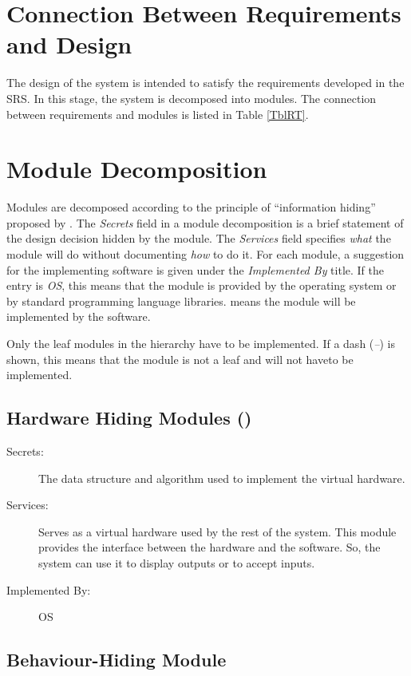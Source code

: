 \documentclass[12pt, titlepage]{article}
\begin{document}
\section{Connection Between Requirements and Design} \label{SecConnection}

The design of the system is intended to satisfy the requirements developed in
the SRS. In this stage, the system is decomposed into modules. The connection
between requirements and modules is listed in Table \ref{TblRT}.

\section{Module Decomposition} \label{SecMD}

Modules are decomposed according to the principle of ``information hiding''
proposed by \citet{ParnasEtAl1984}. The \emph{Secrets} field in a module
decomposition is a brief statement of the design decision hidden by the
module. The \emph{Services} field specifies \emph{what} the module will do
without documenting \emph{how} to do it. For each module, a suggestion for the
implementing software is given under the \emph{Implemented By} title. If the
entry is \emph{OS}, this means that the module is provided by the operating
system or by standard programming language libraries. \emph{\progname{}} means
the
module will be implemented by the \progname{} software.

Only the leaf modules in the hierarchy have to be implemented. If a dash
(\emph{--}) is shown, this means that the module is not a leaf and will not
haveto be implemented.

\subsection{Hardware Hiding Modules ()}

\begin{description}
\item[Secrets:]The data structure and algorithm used to implement the virtual
  hardware.
\item[Services:]Serves as a virtual hardware used by the rest of the
  system. This module provides the interface between the hardware and the
  software. So, the system can use it to display outputs or to accept inputs.
\item[Implemented By:] OS
\end{description}

\subsection{Behaviour-Hiding Module}
\end{document}
